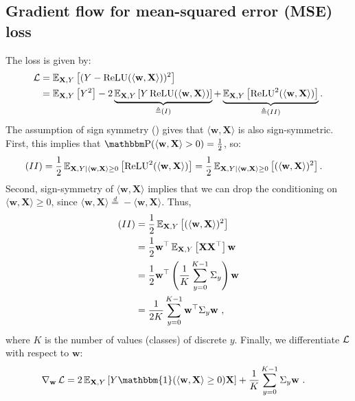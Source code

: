 \subsection{Gradient flow for mean-squared error (MSE) loss}
The loss is given by:
\begin{align}
    \operatorname{\mathcal{L}} 
    &= \operatorname{\mathbb{E}}_{\mathbf{X},Y}\left[ (Y - \operatorname{ReLU}(\langle \mathbf{w}, \mathbf{X} \rangle) )^2 \right] \notag \\
    &= \operatorname{\mathbb{E}}_{\mathbf{X},Y}\left[ Y^2 \right] - 2 \underbrace{ \operatorname{\mathbb{E}}_{\mathbf{X},Y}\left[ Y \operatorname{ReLU}(\langle \mathbf{w}, \mathbf{X} \rangle) \right] }_{\triangleq (I)} + \underbrace{ \operatorname{\mathbb{E}}_{\mathbf{X},Y}\left[ \operatorname{ReLU}^2(\langle \mathbf{w}, \mathbf{X} \rangle) \right] }_{\triangleq (II)}. \label{eq:loss_2relu_neuron}
\end{align}
The assumption of sign symmetry () gives that 
$\langle \mathbf{w}, \mathbf{X} \rangle$ is also sign-symmetric.
First, this implies that $\PR( \langle \mathbf{w}, \mathbf{X} \rangle > 0 ) = \frac{1}{2}$, so:
\begin{align*}
    (II)
    &= \frac{1}{2} \operatorname{\mathbb{E}}_{\mathbf{X},Y \mid \langle \mathbf{w}, \mathbf{X} \rangle \geq 0}\left[ \operatorname{ReLU}^2(\langle \mathbf{w}, \mathbf{X} \rangle) \right]
    = \frac{1}{2} \operatorname{\mathbb{E}}_{\mathbf{X},Y \mid \langle \mathbf{w}, \mathbf{X} \rangle \geq 0}\left[ (\langle \mathbf{w}, \mathbf{X} \rangle)^2 \right].
\end{align*}
Second, sign-symmetry of $\langle \mathbf{w}, \mathbf{X} \rangle$ 
implies that we can drop the conditioning on $\langle \mathbf{w}, \mathbf{X} \rangle \geq 0$, since $\langle \mathbf{w}, \mathbf{X} \rangle \overset{d}{=} -\langle \mathbf{w}, \mathbf{X} \rangle$.
Thus,
\begin{align*}
    (II)
    &= \frac{1}{2} \operatorname{\mathbb{E}}_{\mathbf{X},Y}\left[ (\langle \mathbf{w}, \mathbf{X} \rangle)^2 \right] \\
    &= \frac{1}{2} \mathbf{w}^\top \operatorname{\mathbb{E}}_{\mathbf{X},Y} \left[ \mathbf{X} \mathbf{X}^\top \right] \mathbf{w} \\
    &= \frac{1}{2} \mathbf{w}^\top \left( \frac{1}{K} \sum_{y=0}^{K-1} \Sigma_y \right) \mathbf{w}  \\
    &= \frac{1}{2K} \sum_{y=0}^{K-1} \mathbf{w}^\top \Sigma_y \mathbf{w}~,
\end{align*}
where $K$ is the number of values (classes) of discrete $y$.
Finally, we differentiate $\operatorname{\mathcal{L}}$ with respect to $\mathbf{w}$:
\begin{align*}
  \nabla_\mathbf{w} \LL &= 2 \E_{\mathbf{X},Y}\left[ Y \mathbbm{1}( \langle \mathbf{w}, \mathbf{X} \rangle \geq 0) \mathbf{X} \right] + \frac{1}{K} \sum_{y=0}^{K-1} \Sigma_y \mathbf{w}~.
\end{align*}
